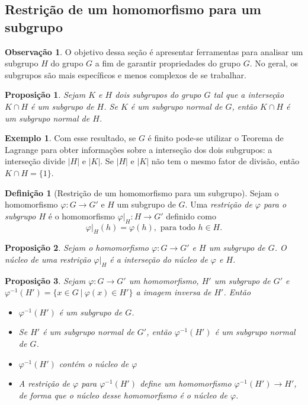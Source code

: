 \documentclass[a4paper,12pt]{report}
\theoremstyle{plain}
\newtheorem{proposicao}{Proposição}[section]
\theoremstyle{definition}
\newtheorem{definicao}{Definição}[section]
\newtheorem{observacao}{Observação}[section]
\newtheorem{exemplo}{Exemplo}[section]
\begin{document}
\subsection{Restrição de um homomorfismo para um subgrupo}

\begin{observacao}
	O objetivo dessa seção é apresentar ferramentas para analisar um subgrupo \(H\)
	do grupo \(G\) a fim de garantir propriedades do grupo \(G\). No geral,
	os subgrupos são mais específicos e menos complexos de se trabalhar.
\end{observacao}

\begin{proposicao}
	Sejam \(K\) e \(H\) dois subgrupos do grupo \(G\)
	tal que a interseção \(K\cap H\) é um subgrupo de \(H\). Se \(K\) é um
	subgrupo normal de \(G\), então \(K\cap H\) é um subgrupo normal de
	\(H\).	
\end{proposicao}

\begin{exemplo}
	Com esse resultado, se \(G\) é finito pode-se utilizar o
	Teorema de Lagrange para obter informações sobre a interseção dos dois
	subgrupos: a interseção divide \(|H|\) e \(|K|\). Se \(|H|\) e \(|K|\)
	não tem o mesmo fator de divisão, então \(K\cap H = \{1\}\).	
\end{exemplo}

\begin{definicao}[Restrição de um homomorfismo para um subgrupo]
	Sejam o homomorfismo \(\varphi:G\longrightarrow G'\)
	e \(H\) um subgrupo de \(G\). Uma \emph{restrição de \(\varphi\) para o subgrupo \(H\)} é o homomorfismo \(\varphi|_H:H\longrightarrow G'\)
	definido como
	\[\varphi|_H(h) = \varphi(h), \text{ para todo }h\in H.\]	
\end{definicao}

\begin{proposicao}
	Sejam o homomorfismo
	\(\varphi:G\longrightarrow G'\) e \(H\) um subgrupo de \(G\). O núcleo
	de uma restrição \(\varphi|_H\) é a interseção do núcleo de \(\varphi\)
	e \(H\).	
\end{proposicao}

\begin{proposicao}
	 Sejam \(\varphi:G\longrightarrow G'\) um
	homomorfismo, \(H'\) um subgrupo de \(G'\) e
	\(\varphi^{-1}(H') = \{x \in G \ | \ \varphi(x) \in H'\}\) a imagem
	inversa de \(H'\). Então
	\begin{itemize}
		\item \(\varphi^{-1}(H')\) é um subgrupo de \(G\).
		\item Se \(H'\) é um subgrupo normal de \(G'\), então \(\varphi^{-1}(H')\) é
		um subgrupo normal de \(G\).
		\item \(\varphi^{-1}(H')\) contém o núcleo de \(\varphi\)
		\item A restrição de \(\varphi\) para \(\varphi^{-1}(H')\) define um
		homomorfismo \(\varphi^{-1}(H')\longrightarrow H'\), de forma que o
		núcleo desse homomorfismo é o núcleo de \(\varphi\).
	\end{itemize}
\end{proposicao}
\end{document}
